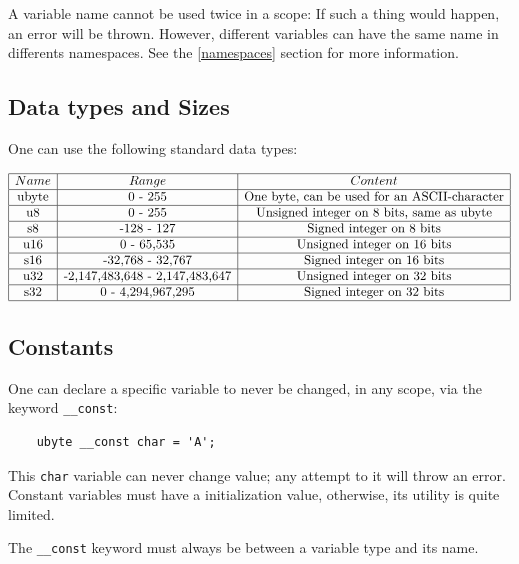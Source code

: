 \documentclass{scrartcl}
\begin{document}
            A variable name cannot be used twice in a scope: If such a thing
            would happen, an error will be thrown. However, different variables
            can have the same name in differents namespaces. See the \ref{namespaces}
            section for more information.
        \subsection{Data types and Sizes}
            One can use the following standard data types:

$\begin{array}{|c|c|c|}
\hline
Name & Range & Content\\
\hline
\text{ubyte} & \text{0 - 255} & \text{One byte, can be used for an ASCII-character}\\
\hline
\text{u8} & \text{0 - 255} & \text{Unsigned integer on 8 bits, same as ubyte}\\
\hline
\text{s8} & \text{-128 - 127} & \text{Signed integer on 8 bits}\\
\hline
\text{u16} & \text{0 - 65,535} & \text{Unsigned integer on 16 bits}\\
\hline
\text{s16} & \text{-32,768 - 32,767} & \text{Signed integer on 16 bits}\\
\hline
\text{u32} & \text{-2,147,483,648 - 2,147,483,647} & \text{Unsigned integer on 32 bits}\\
\hline
\text{s32} & \text{0 - 4,294,967,295} & \text{Signed integer on 32 bits}\\
\hline
\end{array}$
        \subsection{Constants} \label{const}
            One can declare a specific variable to never be changed, in any scope,
            via the keyword \texttt{\_\_const}:
            \begin{lstlisting}
    ubyte __const char = 'A';
            \end{lstlisting}
            This \texttt{char} variable can never change value; any attempt to it
            will throw an error.
            Constant variables must have a initialization value, otherwise, its
            utility is quite limited.

            The \texttt{\_\_const} keyword must always be between a variable
            type and its name.
\end{document}
